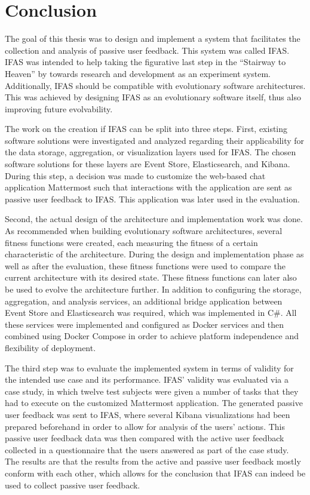 %
\chapter{Conclusion}
\label{ch:conclusion}

The goal of this thesis was to design and implement a system that facilitates the collection and analysis of passive user feedback.
This system was called \acf{IFAS}.
\ac{IFAS} was intended to help taking the figurative last step in the ``Stairway to Heaven'' by \citet{Olsson2012} towards research and development as an experiment system.
Additionally, \ac{IFAS} should be compatible with evolutionary software architectures.
This was achieved by designing \ac{IFAS} as an evolutionary software itself, thus also improving future evolvability.

The work on the creation if \ac{IFAS} can be split into three steps.
First, existing software solutions were investigated and analyzed regarding their applicability for the data storage, aggregation, or visualization layers used for \ac{IFAS}.
The chosen software solutions for these layers are Event Store, Elasticsearch, and Kibana.
During this step, a decision was made to customize the web-based chat application Mattermost such that interactions with the application are sent as passive user feedback to \ac{IFAS}.
This application was later used in the evaluation.

Second, the actual design of the architecture and implementation work was done.
As recommended when building evolutionary software architectures, several fitness functions were created, each measuring the fitness of a certain characteristic of the architecture.
During the design and implementation phase as well as after the evaluation, these fitness functions were used to compare the current architecture with its desired state.
These fitness functions can later also be used to evolve the architecture further.
In addition to configuring the storage, aggregation, and analysis services, an additional bridge application between Event Store and Elasticsearch was required, which was implemented in C\#.
All these services were implemented and configured as Docker services and then combined using Docker Compose in order to achieve platform independence and flexibility of deployment.

The third step was to evaluate the implemented system in terms of validity for the intended use case and its performance.
\ac{IFAS}' validity was evaluated via a case study, in which twelve test subjects were given a number of tasks that they had to execute on the customized Mattermost application.
The generated passive user feedback was sent to \ac{IFAS}, where several Kibana visualizations had been prepared beforehand in order to allow for analysis of the users' actions.
This passive user feedback data was then compared with the active user feedback collected in a questionnaire that the users answered as part of the case study.
The results are that the results from the active and passive user feedback mostly conform with each other, which allows for the conclusion that \ac{IFAS} can indeed be used to collect passive user feedback.

